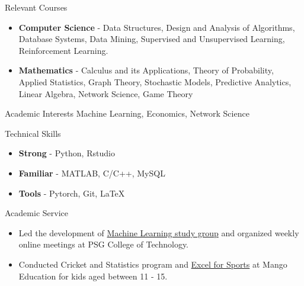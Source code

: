 \documentclass{resume} %
\begin{document}
\begin{rSection}{Relevant Courses}
\begin{itemize}[leftmargin=*]
\itemsep -0.5em 
\item \textbf{Computer Science} - Data Structures, Design and Analysis of Algorithms, Database Systems, Data Mining, Supervised and Unsupervised Learning, Reinforcement Learning.
\item \textbf{Mathematics} - Calculus and its Applications, Theory of Probability, Applied Statistics, Graph Theory, Stochastic Models, Predictive Analytics, Linear Algebra, Network Science\footnotemark[1], Game Theory\footnotemark[1]
\end{itemize}
\end{rSection}

\begin{rSection}{Academic Interests}
Machine Learning, Economics, Network Science
\end{rSection}

\begin{rSection}{Technical Skills}
\begin{itemize}[leftmargin=*]
\itemsep -0.5em 
\item \textbf{Strong} - Python, Rstudio
\item \textbf{Familiar} - MATLAB, C/C++, MySQL
\item \textbf{Tools} - Pytorch, Git, \LaTeX
\end{itemize}
\end{rSection}

\begin{rSection}{Academic Service}
\vspace*{0.1in}
\begin{itemize}[leftmargin=*]
\item Led the development of \href{https://groups.google.com/g/psg-ml-seminar}{Machine Learning study group} and organized weekly online meetings at PSG College of Technology.
\item Conducted Cricket and Statistics program and \href{https://themango.co/programs/excel-with-sports/}{Excel for Sports} at Mango Education for kids aged between 11 - 15.
\end{itemize}
\end{rSection}
\end{document}
